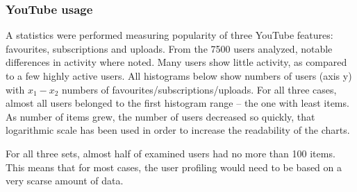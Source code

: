 \subsubsection{YouTube usage}

A statistics were performed measuring popularity of three YouTube features: favourites,
subscriptions and uploads. From the 7500 users analyzed, notable differences in activity
where noted. Many users show little activity, as compared to a few highly active users.
All histograms below show numbers of users
(axis y) with $x_1-x_2$ numbers of favourites/subscriptions/uploads. For all
three cases, almost all users belonged to the first histogram range -- the one
with least items. As number of items grew, the number of users decreased so
quickly, that logarithmic scale has been used in order to increase the readability of the
charts.

For all three sets, almost half of examined users had no more than 100 items.
This means that for most cases, the user profiling would need to be based on a very
scarse amount of data.

